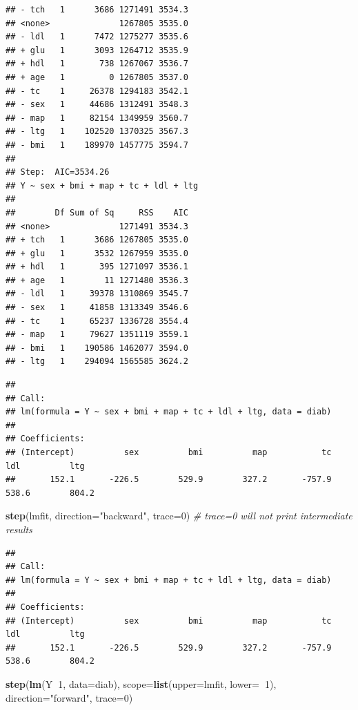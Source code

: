 \documentclass[
]{book}
\newenvironment{Shaded}{\begin{snugshade}}{\end{snugshade}}
\newcommand{\CommentTok}[1]{\textcolor[rgb]{0.56,0.35,0.01}{\textit{#1}}}
\newcommand{\DataTypeTok}[1]{\textcolor[rgb]{0.13,0.29,0.53}{#1}}
\newcommand{\DecValTok}[1]{\textcolor[rgb]{0.00,0.00,0.81}{#1}}
\newcommand{\KeywordTok}[1]{\textcolor[rgb]{0.13,0.29,0.53}{\textbf{#1}}}
\newcommand{\NormalTok}[1]{#1}
\newcommand{\OperatorTok}[1]{\textcolor[rgb]{0.81,0.36,0.00}{\textbf{#1}}}
\newcommand{\StringTok}[1]{\textcolor[rgb]{0.31,0.60,0.02}{#1}}
\begin{document}
\begin{verbatim}
## - tch   1      3686 1271491 3534.3
## <none>              1267805 3535.0
## - ldl   1      7472 1275277 3535.6
## + glu   1      3093 1264712 3535.9
## + hdl   1       738 1267067 3536.7
## + age   1         0 1267805 3537.0
## - tc    1     26378 1294183 3542.1
## - sex   1     44686 1312491 3548.3
## - map   1     82154 1349959 3560.7
## - ltg   1    102520 1370325 3567.3
## - bmi   1    189970 1457775 3594.7
## 
## Step:  AIC=3534.26
## Y ~ sex + bmi + map + tc + ldl + ltg
## 
##        Df Sum of Sq     RSS    AIC
## <none>              1271491 3534.3
## + tch   1      3686 1267805 3535.0
## + glu   1      3532 1267959 3535.0
## + hdl   1       395 1271097 3536.1
## + age   1        11 1271480 3536.3
## - ldl   1     39378 1310869 3545.7
## - sex   1     41858 1313349 3546.6
## - tc    1     65237 1336728 3554.4
## - map   1     79627 1351119 3559.1
## - bmi   1    190586 1462077 3594.0
## - ltg   1    294094 1565585 3624.2
\end{verbatim}

\begin{verbatim}
## 
## Call:
## lm(formula = Y ~ sex + bmi + map + tc + ldl + ltg, data = diab)
## 
## Coefficients:
## (Intercept)          sex          bmi          map           tc          ldl          ltg  
##       152.1       -226.5        529.9        327.2       -757.9        538.6        804.2
\end{verbatim}

\begin{Shaded}
\begin{Highlighting}[]
    \KeywordTok{step}\NormalTok{(lmfit, }\DataTypeTok{direction=}\StringTok{"backward"}\NormalTok{, }\DataTypeTok{trace=}\DecValTok{0}\NormalTok{) }\CommentTok{# trace=0 will not print intermediate results}
\end{Highlighting}
\end{Shaded}

\begin{verbatim}
## 
## Call:
## lm(formula = Y ~ sex + bmi + map + tc + ldl + ltg, data = diab)
## 
## Coefficients:
## (Intercept)          sex          bmi          map           tc          ldl          ltg  
##       152.1       -226.5        529.9        327.2       -757.9        538.6        804.2
\end{verbatim}

\begin{Shaded}
\begin{Highlighting}[]
    \KeywordTok{step}\NormalTok{(}\KeywordTok{lm}\NormalTok{(Y}\OperatorTok{~}\DecValTok{1}\NormalTok{, }\DataTypeTok{data=}\NormalTok{diab), }\DataTypeTok{scope=}\KeywordTok{list}\NormalTok{(}\DataTypeTok{upper=}\NormalTok{lmfit, }\DataTypeTok{lower=}\OperatorTok{~}\DecValTok{1}\NormalTok{), }\DataTypeTok{direction=}\StringTok{"forward"}\NormalTok{, }\DataTypeTok{trace=}\DecValTok{0}\NormalTok{)}
\end{Highlighting}
\end{Shaded}
\end{document}
